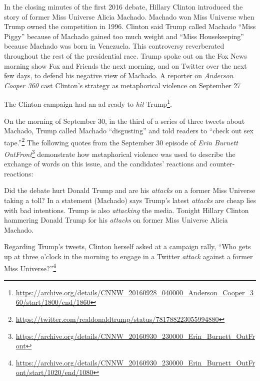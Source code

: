 In the closing minutes of the first 2016 debate, Hillary Clinton introduced the 
story of former Miss Universe
Alicia Machado. Machado won Miss Universe when Trump owned the competition
in 1996. Clinton said Trump called Machado ``Miss Piggy'' because
of Machado gained too much weight and ``Miss Housekeeping'' 
because Machado was born in Venezuela. 
This controversy reverberated throughout the rest of the presidential race.
Trump spoke out on the Fox News morning show Fox and Friends the 
next morning, and on Twitter over the 
next few days, to defend his negative view of Machado. A reporter on 
\emph{Anderson Cooper 360} cast Clinton's strategy as metaphorical violence 
on September 27
\begin{exe}
  \ex The Clinton campaign had an ad ready to \emph{hit} Trump\footnote{\url{https://archive.org/details/CNNW_20160928_040000_Anderson_Cooper_360/start/1800/end/1860}}.
\end{exe}
On the morning of September 30, in the third of
a series of three tweets about Machado, Trump called 
Machado ``disgusting'' and told readers to ``check out sex tape.''\footnote{\url{https://twitter.com/realdonaldtrump/status/781788223055994880}} 
The following quotes from the September 30 episode
of \emph{Erin Burnett OutFront}\footnote{\url{https://archive.org/details/CNNW_20160930_230000_Erin_Burnett_OutFront}} 
demonstrate how metaphorical violence was used
to describe the exchange of words on this issue, and the candidates' 
reactions and counter-reactions:

\begin{exe}
  \ex Did the debate hurt Donald Trump and are his \emph{attacks} on a former
    Miss Universe taking a toll?
  \ex In a statement (Machado) says Trump's latest \emph{attacks} are cheap lies 
    with bad intentions.
  \ex Trump is also \emph{attacking} the media.
  \ex Tonight Hillary Clinton hammering Donald Trump for his \emph{attacks} on 
    former Miss Universe Alicia Machado.
\end{exe}
Regarding Trump's tweets, Clinton herself asked at a campaign rally, ``Who
gets up at three o'clock in the morning to engage in a Twitter \emph{attack} against
a former Miss Universe?''\footnote{\url{https://archive.org/details/CNNW_20160930_230000_Erin_Burnett_OutFront/start/1020/end/1080}} 


